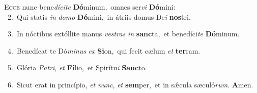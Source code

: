 \lettrine{\initial\textcolor{\initialcolor}{E}}{cce} nunc bene\-\textit{dí}\-\textit{ci}\textit{te} \textbf{Dó}\-minum,~\star omnes ser\textit{vi} \textbf{Dó}\-mini:\\
{\numbfont\textcolor{\numbcolor}{~2.}}~Qui statis \textit{in} \textit{do}\-\textit{mo} \textbf{Dó}\-mini,~\star in átriis domus De\textit{i} \textbf{nos}\-tri.\par
{\numbfont\textcolor{\numbcolor}{~3.}}~In nóctibus extóllite manus \textit{ves}\-\textit{tras} \textit{in} \textbf{sanc}\-ta,~\star et benedíci\textit{te} \textbf{Dó}\-minum.\par
{\numbfont\textcolor{\numbcolor}{~4.}}~Benedícat te Dó\-\textit{mi}\-\textit{nus} \textit{ex} \textbf{Si}\-on,~\star qui fecit cælum \textit{et} \textbf{ter}\-ram.\par
{\numbfont\textcolor{\numbcolor}{~5.}}~Glória \textit{Pa}\-\textit{tri}, \textit{et} \textbf{Fí}\-lio,~\star et Spirítu\textit{i} \textbf{Sanc}\-to.\par
{\numbfont\textcolor{\numbcolor}{~6.}}~Sicut erat in princípio, \textit{et} \textit{nunc}\-, \textit{et} \textbf{sem}\-per,~\star et in sǽcula sæculó\-\textit{rum}\-. \textbf{A}\-men.\par
